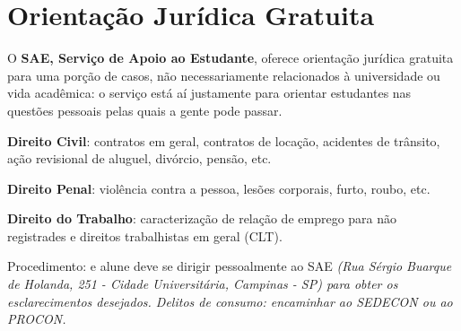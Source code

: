 \section{Orientação Jurídica Gratuita}

O \textbf{SAE, Serviço de Apoio ao Estudante}, oferece orientação jurídica gratuita para
uma porção de casos, não necessariamente relacionados à universidade ou vida
acadêmica: o serviço está aí justamente para orientar estudantes nas questões pessoais
pelas quais a gente pode passar.

\textbf{Direito Civil}: contratos em geral, contratos de locação, acidentes de trânsito, ação
revisional de aluguel, divórcio, pensão, etc.

\textbf{Direito Penal}: violência contra a pessoa, lesões corporais, furto, roubo, etc.

\textbf{Direito do Trabalho}: caracterização de relação de emprego para não registrades e
direitos trabalhistas em geral (CLT).

Procedimento: e alune deve se dirigir pessoalmente ao SAE \textit{(Rua Sérgio Buarque
de Holanda, 251 - Cidade Universitária, Campinas - SP) para obter os esclarecimentos
desejados. Delitos de consumo: encaminhar ao SEDECON ou ao PROCON.}